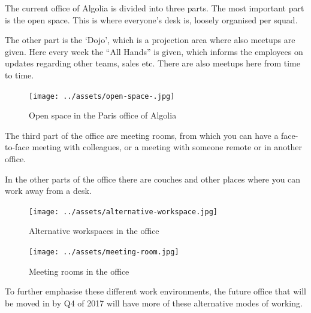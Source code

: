 The current office of Algolia is divided into three parts. The most important part is the open space. This is where everyone's desk is, loosely organised per squad.

The other part is the `Dojo', which is a projection area where also meetups are given. Here every week the ``All Hands'' is given, which informs the employees on updates regarding other teams, sales etc. There are also meetups here from time to time.


\begin{figure}[H]
  \centering
  \texttt{[image: ../assets/open-space-.jpg]}
  \caption{Open space in the Paris office of Algolia}
  \label{figure:algolia-open-space}
\end{figure}

The third part of the office are meeting rooms, from which you can have a face-to-face meeting with colleagues, or a meeting with someone remote or in another office.

In the other parts of the office there are couches and other places where you can work away from a desk.

\begin{figure}[H]
\centering
\begin{minipage}{.5\textwidth}
  \centering
  \texttt{[image: ../assets/alternative-workspace.jpg]}
  \caption{Alternative workspaces in the office}
  \label{figure:algolia-alternative-space}
\end{minipage}%
\begin{minipage}{.5\textwidth}
  \centering
  \texttt{[image: ../assets/meeting-room.jpg]}
  \caption{Meeting rooms in the office}
  \label{figure:algolia-meeting-rooms}
\end{minipage}
\end{figure}

To further emphasise these different work environments, the future office that will be moved in by Q4 of 2017 will have more of these alternative modes of working. %
